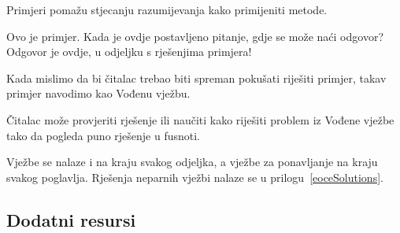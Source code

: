 \noindent%
Primjeri pomažu stjecanju razumijevanja kako primijeniti metode.

\begin{examplewrap}
\begin{nexample}{Ovo je primjer.
  Kada je ovdje postavljeno pitanje, gdje se može naći odgovor?}
  Odgovor je ovdje, u odjeljku s rješenjima primjera!
\end{nexample}
\end{examplewrap}

\noindent%
Kada mislimo da bi čitalac trebao biti spreman pokušati
riješiti primjer, takav primjer navodimo kao Vođenu vježbu.

\begin{exercisewrap}
\begin{nexercise}
Čitalac može provjeriti rješenje ili naučiti kako riješiti problem iz Vođene vježbe
tako da pogleda puno rješenje u fusnoti.\footnotemark{}
\end{nexercise}
\end{exercisewrap}

\noindent%
Vježbe se nalaze i na kraju svakog odjeljka, a vježbe za ponavljanje na kraju svakog poglavlja.
Rješenja neparnih vježbi nalaze se u prilogu~\ref{eoceSolutions}.


\subsection*{{\color{oiB}Dodatni resursi}}

